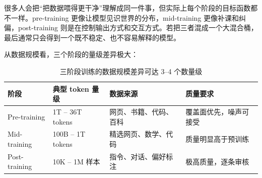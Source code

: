 很多人会把“把数据喂得更干净”理解成同一件事，但实际上每个阶段的目标函数都不一样。pre-training 更像让模型见识世界的分布，mid-training 更像补课和纠偏，post-training 则是在控制输出方式和交互方式。若把三者混成一个大混合桶，最后通常只会得到一个既不稳定、也不容易解释的模型。

从数据规模看，三个阶段的量级差异极大：

\begin{table}[H]
\centering
\begin{tabular}{p{}p{}p{}p{}}
\toprule
\textbf{阶段} & \textbf{典型 token 量级} & \textbf{数据来源} & \textbf{质量要求} \\
\midrule
Pre-training & 1T -- 36T tokens & 网页、书籍、代码、百科 & 覆盖面优先，噪声可接受 \\
Mid-training & 100B -- 1T tokens & 精选网页、数学、代码 & 质量明显高于预训练 \\
Post-training & 10K -- 1M 样本 & 指令、对话、偏好标注 & 极高质量，逐条审核 \\
\bottomrule
\end{tabular}
\caption{三阶段训练的数据规模差异可达 3--4 个数量级}
\end{table}

